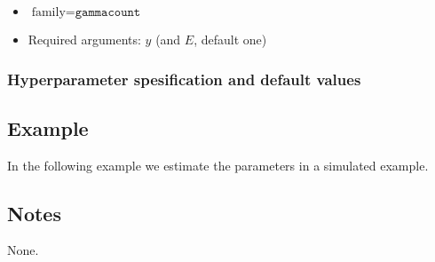 \documentclass[a4paper,11pt]{article}
\begin{document}
\begin{itemize}
\item $\text{family}=\texttt{gammacount}$
\item Required arguments: $y$ (and $E$, default one)
\end{itemize}

\subsubsection*{Hyperparameter spesification and default values}



\subsection*{Example}

In the following example we estimate the parameters in a simulated
example.


\subsection*{Notes}

None.
\end{document}
